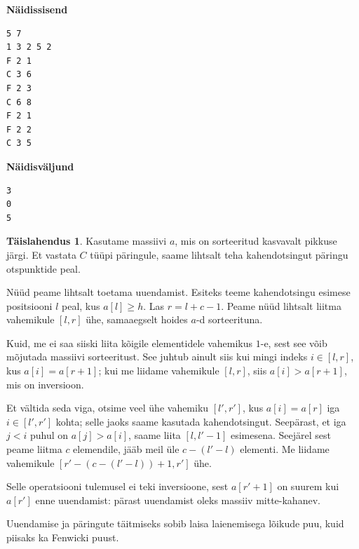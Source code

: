 \documentclass{trkut}
\theoremstyle{definition}
\newtheorem*{solution}{Täislahendus}
\begin{document}
\textbf{Näidissisend}

\begin{verbatim}
5 7
1 3 2 5 2
F 2 1
C 3 6
F 2 3
C 6 8
F 2 1
F 2 2
C 3 5
\end{verbatim}

\textbf{Näidisväljund}

\begin{verbatim}
3
0
5
\end{verbatim}

\parencite{GT}

\begin{solution}
Kasutame massiivi $a$, mis on sorteeritud kasvavalt pikkuse järgi. Et vastata $C$ tüüpi päringule, saame lihtsalt teha kahendotsingut päringu otspunktide peal.

Nüüd peame lihtsalt toetama uuendamist. Esiteks teeme kahendotsingu esimese positsiooni $l$ peal, kus $a[l]\ge h$. Las $r=l+c-1$. Peame nüüd lihtsalt liitma vahemikule $[l,r]$ ühe, samaaegselt hoides $a$-d sorteerituna.

Kuid, me ei saa siiski liita kõigile elementidele vahemikus $1$-e, sest see võib mõjutada massiivi sorteeritust. See juhtub ainult siis kui mingi indeks $i\in [l,r]$, kus $a[i]=a[r+1]$; kui me liidame vahemikule $[l,r]$, siis $a[i]>a[r+1]$, mis on inversioon.

Et vältida seda viga, otsime veel ühe vahemiku $[l', r']$, kus $a[i]=a[r]$  iga $i\in [l',r']$ kohta; selle jaoks saame kasutada kahendotsingut. Seepärast, et iga $j<i$ puhul on $a[j]>a[i]$, saame liita $[l,l'-1]$ esimesena. Seejärel sest peame liitma $c$ elemendile, jääb meil üle $c-(l'-l)$ elementi. Me liidame vahemikule $[r'-(c-(l'-l))+1, r']$ ühe.

Selle operatsiooni tulemusel ei teki inversioone, sest $a[r'+1]$ on suurem kui $a[r']$ enne uuendamist: pärast uuendamist oleks massiiv mitte-kahanev.

Uuendamise ja päringute täitmiseks sobib laisa laienemisega lõikude puu, kuid piisaks ka Fenwicki puust. \parencite{GTS}
\end{solution}
\end{document}
